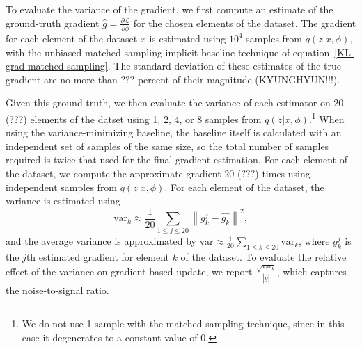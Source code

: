 \documentclass{article} %
\begin{document}

To evaluate the variance of the gradient, we first compute an estimate of the ground-truth gradient $\hat{g} = \frac{\partial \mathcal{L}}{\partial \phi}$ %
for the chosen elements of the dataset. The gradient for each element of the dataset $x$ is estimated using $10^4$ samples from $q(z|x, \phi)$, with %
the unbiased matched-sampling implicit baseline technique of equation~\ref{KL-grad-matched-sampling}.  The standard deviation of these estimates of the true gradient are no more than ??? percent of their magnitude (KYUNGHYUN!!!).  

Given this ground truth, we then evaluate the variance of each estimator on 20 (???) elements of the datset using 1, 2, 4, or 8 samples from $q(z|x, \phi)$.\footnote{We do not use 1 sample with the matched-sampling technique, since in this case it degenerates to a constant value of $0$.}  
When using the variance-minimizing baseline, the baseline itself is calculated with an independent set of samples of the same size, so the total number of samples required is twice that used for the final gradient estimation.
For each element of the dataset, we compute the approximate gradient 20 (???) times using independent samples from $q(z|x, \phi)$.  For each element of the dataset, the variance is estimated using
\begin{equation*}
\text{var}_k \approx \frac{1}{20} \sum_{1 \leq j \leq 20} \left\|g_k^j - \hat{g_k} \right\|^2, 
\end{equation*}
and the average variance is approximated by $\text{var} \approx \frac{1}{20} \sum_{1 \leq k \leq 20} \text{var}_k$,
where $g_k^j$ is the $j$th estimated gradient for element $k$ of the dataset.  %
To evaluate the relative effect of the variance on gradient-based update, we report $\frac{\sqrt{\text{var}_k}}{|\hat{g}|}$, which captures the noise-to-signal ratio.
\end{document}
